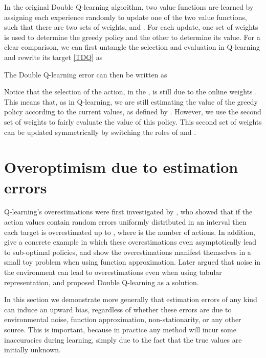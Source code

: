 \documentclass[letterpaper]{article}
\begin{document}
In the original Double Q-learning algorithm, two value functions are learned by assigning each experience randomly to update one of the two value functions, such that there are two sets of weights,  and .  For each update, one set of weights is used to determine the greedy policy and the other to determine its value.
For a clear comparison, we can first untangle the selection and evaluation in Q-learning and rewrite its target \eqref{TDQ} as

The Double Q-learning error can then be written as

Notice that the selection of the action, in the , is still due to the online weights .  This means that, as in Q-learning, we are still estimating the value of the greedy policy according to the current values, as defined by .  However, we use the second set of weights  to fairly evaluate the value of this policy.  This second set of weights can be updated symmetrically by switching the roles of  and .


\section{Overoptimism due to estimation errors}
\label{sec:learningoverest}

Q-learning's overestimations were first investigated by \citet{Thrun:1993}, who showed that if the action values contain random errors uniformly distributed in an interval  then each target is overestimated up to , where  is the number of actions.  In addition, \citeauthor{Thrun:1993} give a concrete example in which these overestimations even asymptotically lead to sub-optimal policies, and show the overestimations manifest themselves in a small toy problem when using function approximation.
Later \citet{vanHasselt:2010} argued that noise in the environment can lead to overestimations even when using tabular representation, and proposed Double Q-learning as a solution.

In this section we demonstrate more generally that estimation errors of any kind can induce an upward bias, regardless of whether these errors are due to environmental noise, function approximation, non-stationarity, or any other source.  This is important, because in practice any method will incur some inaccuracies during learning, simply due to the fact that the true values are initially unknown.
\end{document}
